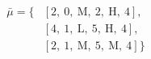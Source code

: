 \begin{equation}
\nonumber
\begin{aligned}
\bar{\mu} = \{  & \left[\text{2}, \ \text{0}, \ \text{M}, \ \text{2}, \ \text{H}, \ \text{4}\right], \\  & \left[\text{4}, \ \text{1}, \ \text{L}, \ \text{5}, \ \text{H}, \ \text{4}\right], \\  & \left[\text{2}, \ \text{1}, \ \text{M}, \ \text{5}, \ \text{M}, \ \text{4}\right]\} \\ 
\end{aligned}
\end{equation}